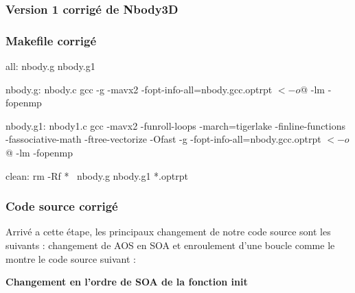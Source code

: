 \documentclass[a4paper, 12pt, twoside]{article}
\begin{document}
   \subsubsection{Version 1 corrigé de Nbody3D}
   \subsubsection*{Makefile corrigé}
 \begin{customFrame}
all: nbody.g nbody.g1

nbody.g: nbody.c
	gcc -g -mavx2 -fopt-info-all=nbody.gcc.optrpt $< -o $@ -lm -fopenmp

nbody.g1: nbody1.c
	gcc  -mavx2 -funroll-loops -march=tigerlake -finline-functions -fassociative-math -ftree-vectorize -Ofast -g -fopt-info-all=nbody.gcc.optrpt $< -o $@ -lm -fopenmp


clean:
	rm -Rf *~ nbody.g nbody.g1 *.optrpt



\end{customFrame}

 
 \subsubsection*{Code source corrigé}
 Arrivé a cette étape, les principaux changement de notre code source sont les suivants : changement de AOS en SOA et enroulement d'une boucle comme le
montre le code source suivant :

\textbf{Changement en l'ordre de SOA de la fonction init }
\end{document}
